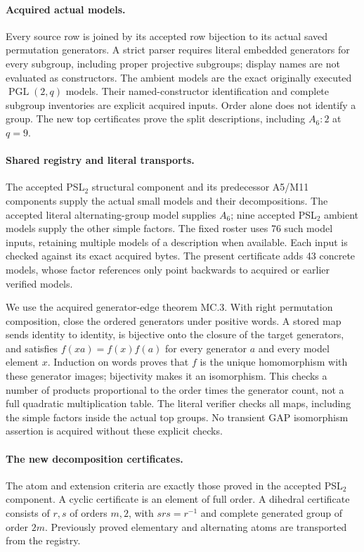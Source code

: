 \documentclass[11pt]{article}
\begin{document}
\paragraph{Acquired actual models.}
Every source row is joined by its accepted row bijection to its actual
saved permutation generators. A strict parser requires literal embedded
generators for every subgroup, including proper projective subgroups;
display names are not evaluated as constructors. The ambient models are
the exact originally executed $\operatorname{PGL}(2,q)$ models. Their
named-constructor identification and complete subgroup inventories are
explicit acquired inputs. Order alone does not identify a group. The new
top certificates prove the split descriptions, including $A_6:2$ at $q=9$.

\newpage
\paragraph{Shared registry and literal transports.}
The accepted PSL$_2$ structural component and its predecessor A5/M11
components supply the actual small models and their decompositions.
The accepted literal alternating-group model supplies $A_6$; nine accepted
PSL$_2$ ambient models supply the other simple factors. The fixed roster
uses 76 such model inputs, retaining multiple models of a description when
available. Each input is checked against its exact acquired bytes. The
present certificate adds 43 concrete models, whose factor references only
point backwards to acquired or earlier verified models.

We use the acquired generator-edge theorem MC.3. With right permutation
composition, close the ordered generators under positive words. A stored
map sends identity to identity, is bijective onto the closure of the target
generators, and satisfies $f(xa)=f(x)f(a)$ for every generator $a$ and
every model element $x$. Induction on words proves that $f$ is the unique
homomorphism with these generator images; bijectivity makes it an
isomorphism. This checks a number of products proportional to the order
times the generator count, not a full quadratic multiplication table.
The literal verifier checks all maps, including the simple factors inside
the actual top groups. No transient GAP isomorphism assertion is acquired
without these explicit checks.

\paragraph{The new decomposition certificates.}
The atom and extension criteria are exactly those proved in the accepted
PSL$_2$ component. A cyclic certificate is an element of full order.
A dihedral certificate consists of $r,s$ of orders $m,2$, with
$srs=r^{-1}$ and complete generated group of order $2m$.
Previously proved elementary and alternating atoms are transported from
the registry.
\end{document}
